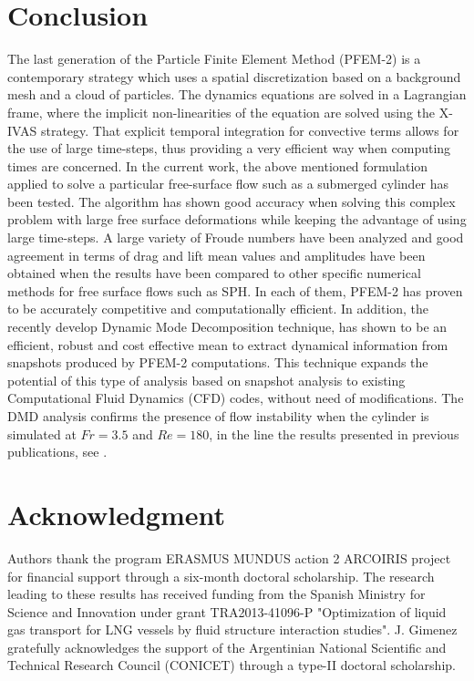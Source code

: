 \documentclass[a4paper,conference]{IEEEtran}
\begin{document}



\section{Conclusion}
The last generation of the Particle Finite Element Method (PFEM-2) is a contemporary strategy which uses a spatial discretization based on a background mesh and a cloud of particles. The dynamics equations are solved in a Lagrangian frame, where the implicit non-linearities of the equation are solved using the X-IVAS strategy. That explicit temporal integration for convective terms allows for the use of large time-steps, thus providing a very efficient way when computing times are concerned.
In the current work, the above mentioned formulation applied to solve a particular free-surface flow such as a submerged cylinder has been tested. The algorithm has shown good accuracy when solving this complex problem with large free surface deformations while keeping the advantage of using large time-steps. A large variety of Froude numbers have been analyzed and good agreement in terms of drag and lift mean values and amplitudes have been obtained when the results have been compared to other specific numerical methods for free surface flows such as SPH. In each of them, PFEM-2 has proven to be accurately competitive and computationally efficient.
In addition, the recently develop Dynamic Mode Decomposition technique, has shown to be an efficient, robust and cost effective mean to extract dynamical information from snapshots produced by PFEM-2 computations. This technique expands the potential of this type of analysis based on snapshot analysis to existing Computational Fluid Dynamics (CFD) codes, without need of modifications. The DMD analysis confirms the presence of flow instability when the cylinder is simulated at $Fr=3.5$ and $Re=180$, in the line the results presented in previous publications, see \cite{Dimas89}.

\section*{Acknowledgment}
Authors thank the program ERASMUS MUNDUS action 2 ARCOIRIS project for financial support through a six-month doctoral scholarship. The research leading to these results has received funding from the Spanish Ministry for Science and Innovation under grant TRA2013-41096-P
"Optimization of liquid gas transport for LNG vessels by fluid structure interaction studies". J. Gimenez gratefully acknowledges the support of the Argentinian National Scientific and Technical Research Council (CONICET) through a type-II doctoral scholarship.



\end{document}
